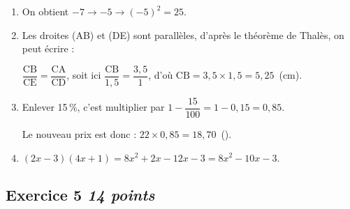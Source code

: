 \documentclass[10pt]{article}
\newcommand{\euro}{\eurologo{}}
\begin{document}
\begin{enumerate}
    \item On obtient $- 7 \to - 5 \to (- 5)^2 = 25$.
    
    \item Les droites (AB) et (DE) sont parallèles, d'après le théorème de Thalès, on peut écrire :
    
    $\dfrac{\text{CB}}{\text{CE}} = \dfrac{\text{CA}}{\text{CD}}$, soit ici $\dfrac{\text{CB}}{1,5} = \dfrac{3,5}{1}$, d'où $\text{CB} = 3,5 \times 1,5 = 5,25$~(cm).
    
    \item Enlever 15\,\%, c'est multiplier par $1 - \dfrac{15}{100} = 1 - 0,15 = 0,85$.
    
    Le nouveau prix est donc : $22 \times 0,85 = 18,70$~(\euro).

    \item $(2x - 3)(4x + 1) = 8x^2 + 2x  - 12x  - 3 = 8x^2 - 10x  - 3$.
\end{enumerate}
    
\subsection*{Exercice 5 \hfill \textit{14 points}}
\end{document}
